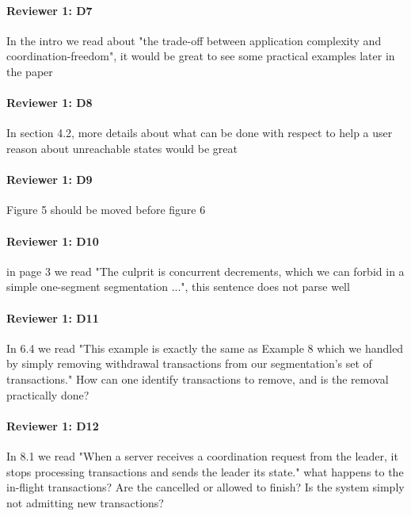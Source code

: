 \documentclass[9pt]{article}
\begin{document}
\begin{multicols*}{2}
\paragraph{Reviewer 1: D7}
\begin{feedback}
  In the intro we read about "the trade-off between application complexity and
  coordination-freedom", it would be great to see some practical examples later
  in the paper
\end{feedback}
\paragraph{Reviewer 1: D8}
\begin{feedback}
  In section 4.2, more details about what can be done with respect to help a
  user reason about unreachable states would be great
\end{feedback}
\paragraph{Reviewer 1: D9}
\begin{feedback}
  Figure 5 should be moved before figure 6
\end{feedback}
\paragraph{Reviewer 1: D10}
\begin{feedback}
  in page 3 we read "The culprit is concurrent decrements, which we can forbid
  in a simple one-segment segmentation ...", this sentence does not parse well
\end{feedback}
\paragraph{Reviewer 1: D11}
\begin{feedback}
  In 6.4 we read "This example is exactly the same as Example 8 which we
  handled by simply removing withdrawal transactions from our segmentation's
  set of transactions." How can one identify transactions to remove, and is the
  removal practically done?
\end{feedback}
\paragraph{Reviewer 1: D12}
\begin{feedback}
  In 8.1 we read "When a server receives a coordination request from the
  leader, it stops processing transactions and sends the leader its state."
  what happens to the in-flight transactions? Are the cancelled or allowed to
  finish? Is the system simply not admitting new transactions?
\end{feedback}


\end{multicols*}
\end{document}
